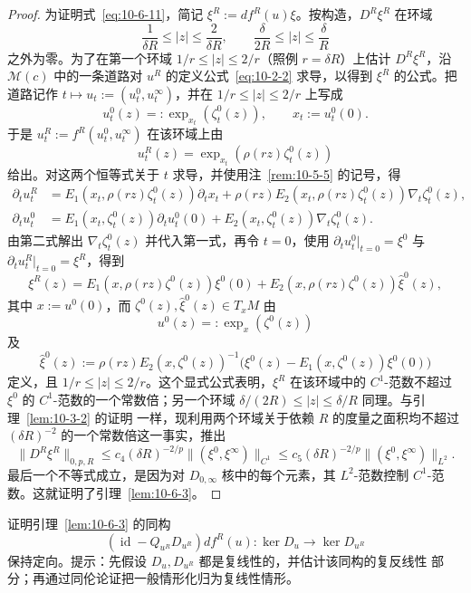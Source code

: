 \begin{proof}
为证明式~\eqref{eq:10-6-11}，简记
$\xi^R:=df^R(u)\xi$。按构造，$D^R\xi^R$ 在环域
\[
  \frac1{\delta R}\le|z|\le\frac2{\delta R},
  \qquad
  \frac\delta{2R}\le|z|\le\frac\delta R
\]
之外为零。为了在第一个环域 $1/r\le|z|\le2/r$（照例
$r=\delta R$）上估计 $D^R\xi^R$，沿 $\mathcal M(c)$ 中的一条道路对
$u^R$ 的定义公式~\eqref{eq:10-2-2} 求导，以得到 $\xi^R$ 的公式。把道路记作
$t\mapsto u_t:=(u_t^0,u_t^\infty)$，并在 $1/r\le|z|\le2/r$ 上写成
\[
  u_t^0(z)=:\exp_{x_t}(\zeta_t^0(z)),
  \qquad x_t:=u_t^0(0).
\]
于是 $u_t^R:=f^R(u_t^0,u_t^\infty)$ 在该环域上由
\[
  u_t^R(z)=\exp_{x_t}(\rho(rz)\zeta_t^0(z))
\]
给出。对这两个恒等式关于 $t$ 求导，并使用注~\ref{rem:10-5-5} 的记号，得
\[
\begin{aligned}
  \partial_tu_t^R
  & =E_1(x_t,\rho(rz)\zeta_t^0(z))\partial_tx_t
    +\rho(rz)E_2(x_t,\rho(rz)\zeta_t^0(z))
      \nabla_t\zeta_t^0(z),\\
  \partial_tu_t^0
  & =E_1(x_t,\zeta_t^0(z))\partial_tu_t^0(0)
    +E_2(x_t,\zeta_t^0(z))\nabla_t\zeta_t^0(z).
\end{aligned}
\]
由第二式解出 $\nabla_t\zeta_t^0(z)$ 并代入第一式，再令 $t=0$，使用
$\partial_tu_t^0|_{t=0}=\xi^0$ 与
$\partial_tu_t^R|_{t=0}=\xi^R$，得到
\begin{equation}\label{eq:10-6-12}
  \xi^R(z)
  =E_1(x,\rho(rz)\zeta^0(z))\xi^0(0)
   +E_2(x,\rho(rz)\zeta^0(z))\widehat\xi^0(z),
\end{equation}
其中 $x:=u^0(0)$，而 $\zeta^0(z),\widehat\xi^0(z)\in T_xM$ 由
\[
  u^0(z)=:\exp_x(\zeta^0(z))
\]
及
\begin{equation}\label{eq:10-6-13}
  \widehat\xi^0(z)
  :=\rho(rz)E_2(x,\zeta^0(z))^{-1}
    \bigl(\xi^0(z)-E_1(x,\zeta^0(z))\xi^0(0)\bigr)
\end{equation}
定义，且 $1/r\le|z|\le2/r$。这个显式公式表明，$\xi^R$ 在该环域中的
$C^1$-范数不超过 $\xi^0$ 的 $C^1$-范数的一个常数倍；另一个环域
$\delta/(2R)\le|z|\le\delta/R$ 同理。与引理~\ref{lem:10-3-2} 的证明
一样，现利用两个环域关于依赖 $R$ 的度量之面积均不超过
$(\delta R)^{-2}$ 的一个常数倍这一事实，推出
\[
  \|D^R\xi^R\|_{0,p,R}
  \le c_4(\delta R)^{-2/p}\|(\xi^0,\xi^\infty)\|_{C^1}
  \le c_5(\delta R)^{-2/p}\|(\xi^0,\xi^\infty)\|_{L^2}.
\]
最后一个不等式成立，是因为对 $D_{0,\infty}$ 核中的每个元素，其
$L^2$-范数控制 $C^1$-范数。这就证明了引理~\ref{lem:10-6-3}。
\end{proof}

\begin{exercise}\label{ex:10-6-4}
证明引理~\ref{lem:10-6-3} 的同构
\[
  (\operatorname{id}-Q_{u^R}D_{u^R})df^R(u):
  \ker D_u\longrightarrow\ker D_{u^R}
\]
保持定向。提示：先假设 $D_u,D_{u^R}$ 都是复线性的，并估计该同构的复反线性
部分；再通过同伦论证把一般情形化归为复线性情形。
\end{exercise}

